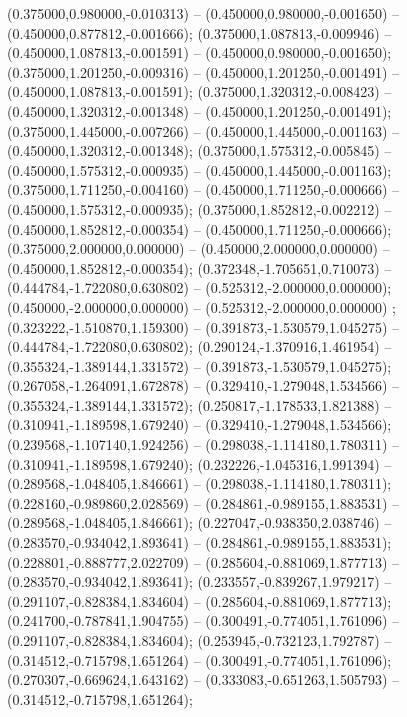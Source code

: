  (0.375000,0.980000,-0.010313) -- (0.450000,0.980000,-0.001650) -- (0.450000,0.877812,-0.001666);
 (0.375000,1.087813,-0.009946) -- (0.450000,1.087813,-0.001591) -- (0.450000,0.980000,-0.001650);
 (0.375000,1.201250,-0.009316) -- (0.450000,1.201250,-0.001491) -- (0.450000,1.087813,-0.001591);
 (0.375000,1.320312,-0.008423) -- (0.450000,1.320312,-0.001348) -- (0.450000,1.201250,-0.001491);
 (0.375000,1.445000,-0.007266) -- (0.450000,1.445000,-0.001163) -- (0.450000,1.320312,-0.001348);
 (0.375000,1.575312,-0.005845) -- (0.450000,1.575312,-0.000935) -- (0.450000,1.445000,-0.001163);
 (0.375000,1.711250,-0.004160) -- (0.450000,1.711250,-0.000666) -- (0.450000,1.575312,-0.000935);
 (0.375000,1.852812,-0.002212) -- (0.450000,1.852812,-0.000354) -- (0.450000,1.711250,-0.000666);
 (0.375000,2.000000,0.000000) -- (0.450000,2.000000,0.000000) -- (0.450000,1.852812,-0.000354);
 (0.372348,-1.705651,0.710073) -- (0.444784,-1.722080,0.630802) -- (0.525312,-2.000000,0.000000);
 (0.450000,-2.000000,0.000000) -- (0.525312,-2.000000,0.000000) ;
 (0.323222,-1.510870,1.159300) -- (0.391873,-1.530579,1.045275) -- (0.444784,-1.722080,0.630802);
 (0.290124,-1.370916,1.461954) -- (0.355324,-1.389144,1.331572) -- (0.391873,-1.530579,1.045275);
 (0.267058,-1.264091,1.672878) -- (0.329410,-1.279048,1.534566) -- (0.355324,-1.389144,1.331572);
 (0.250817,-1.178533,1.821388) -- (0.310941,-1.189598,1.679240) -- (0.329410,-1.279048,1.534566);
 (0.239568,-1.107140,1.924256) -- (0.298038,-1.114180,1.780311) -- (0.310941,-1.189598,1.679240);
 (0.232226,-1.045316,1.991394) -- (0.289568,-1.048405,1.846661) -- (0.298038,-1.114180,1.780311);
 (0.228160,-0.989860,2.028569) -- (0.284861,-0.989155,1.883531) -- (0.289568,-1.048405,1.846661);
 (0.227047,-0.938350,2.038746) -- (0.283570,-0.934042,1.893641) -- (0.284861,-0.989155,1.883531);
 (0.228801,-0.888777,2.022709) -- (0.285604,-0.881069,1.877713) -- (0.283570,-0.934042,1.893641);
 (0.233557,-0.839267,1.979217) -- (0.291107,-0.828384,1.834604) -- (0.285604,-0.881069,1.877713);
 (0.241700,-0.787841,1.904755) -- (0.300491,-0.774051,1.761096) -- (0.291107,-0.828384,1.834604);
 (0.253945,-0.732123,1.792787) -- (0.314512,-0.715798,1.651264) -- (0.300491,-0.774051,1.761096);
 (0.270307,-0.669624,1.643162) -- (0.333083,-0.651263,1.505793) -- (0.314512,-0.715798,1.651264);
